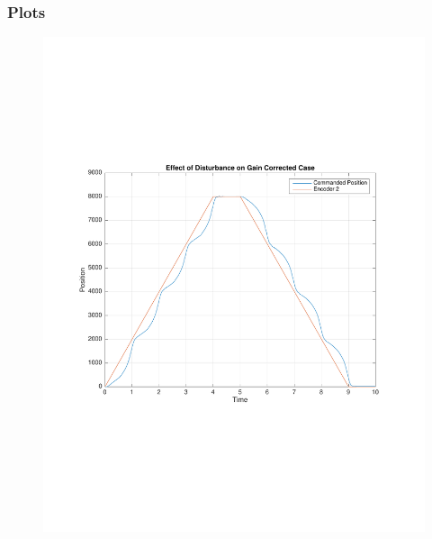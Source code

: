 \documentclass[11pt, a4paper]{article}
\begin{document}
\subsubsection{Plots}
\begin{figure}[H]
\centering
\includegraphics[width = \textwidth]{10_dist.pdf}
\end{figure}
\end{document}
